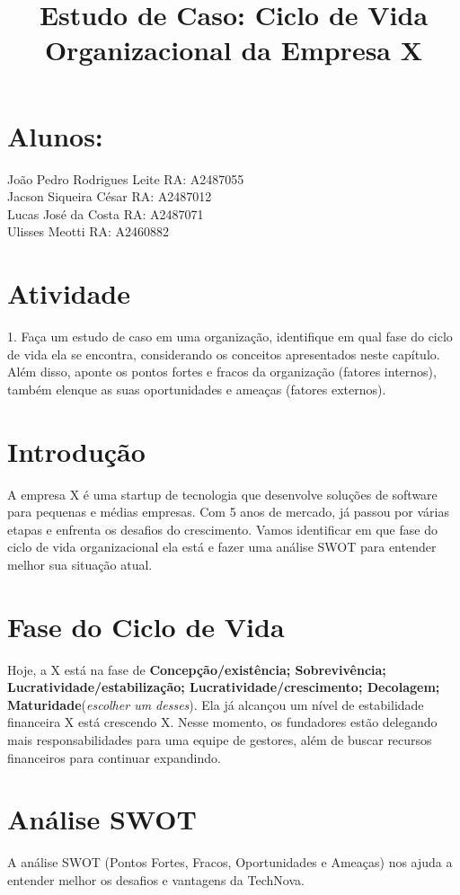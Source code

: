 \documentclass{article}
\title{Estudo de Caso: Ciclo de Vida Organizacional da Empresa X}
\date{}
\begin{document}
	
	\maketitle
	
	\section*{Alunos: }
	João Pedro Rodrigues Leite RA: A2487055 \\
	Jacson Siqueira César RA: A2487012 \\
	Lucas José da Costa RA: A2487071 \\
	Ulisses Meotti RA: A2460882
	
	\section*{Atividade}
	1. Faça um estudo de caso em uma organização, identifique em qual fase do ciclo de vida ela se encontra, considerando os conceitos apresentados neste capítulo. Além disso, aponte os pontos fortes e fracos da organização (fatores internos), também elenque as suas oportunidades e ameaças (fatores externos).
	
	\section{Introdução}
	A empresa X é uma startup de tecnologia que desenvolve soluções de software para pequenas e médias empresas. Com 5 anos de mercado, já passou por várias etapas e enfrenta os desafios do crescimento. Vamos identificar em que fase do ciclo de vida organizacional ela está e fazer uma análise SWOT para entender melhor sua situação atual.
	
	\section{Fase do Ciclo de Vida}
	Hoje, a X está na fase de \textbf{Concepção/existência; Sobrevivência; Lucratividade/estabilização; Lucratividade/crescimento; Decolagem; Maturidade}(\textit{escolher um desses}). Ela já alcançou um nível de estabilidade financeira X está crescendo X. Nesse momento, os fundadores estão delegando mais responsabilidades para uma equipe de gestores, além de buscar recursos financeiros para continuar expandindo.
	
	\section{Análise SWOT}
	A análise SWOT (Pontos Fortes, Fracos, Oportunidades e Ameaças) nos ajuda a entender melhor os desafios e vantagens da TechNova.
	
\end{document}
